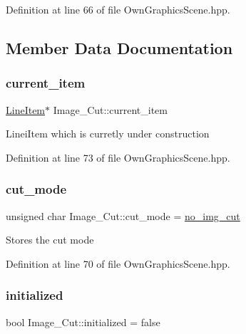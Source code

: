 Definition at line 66 of file Own\+Graphics\+Scene.\+hpp.



\subsection{Member Data Documentation}
\mbox{\label{structImage__Cut_aa3fcac1ab311c38947b343d8913fb2e8}} 
\subsubsection{\texorpdfstring{current\+\_\+item}{current\_item}}
{\footnotesize\ttfamily \mbox{\hyperlink{classLineItem}{Line\+Item}}$\ast$ Image\+\_\+\+Cut\+::current\+\_\+item}

Linei\+Item which is curretly under construction 

Definition at line 73 of file Own\+Graphics\+Scene.\+hpp.

\mbox{\label{structImage__Cut_ad4904a8753086961301a91050f6b2794}} 
\subsubsection{\texorpdfstring{cut\+\_\+mode}{cut\_mode}}
{\footnotesize\ttfamily unsigned char Image\+\_\+\+Cut\+::cut\+\_\+mode = \mbox{\hyperlink{OwnGraphicsScene_8hpp_a749db80b860523fda0b90a1c2afa5067}{no\+\_\+img\+\_\+cut}}}

Stores the cut mode 

Definition at line 70 of file Own\+Graphics\+Scene.\+hpp.

\mbox{\label{structImage__Cut_a7259136300a6eade3ee84743f3e47c1f}} 
\subsubsection{\texorpdfstring{initialized}{initialized}}
{\footnotesize\ttfamily bool Image\+\_\+\+Cut\+::initialized = false}

